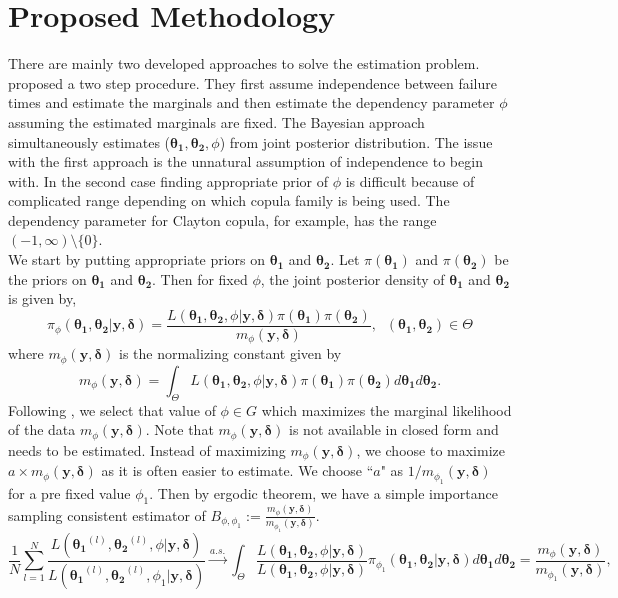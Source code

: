 \documentclass[11pt]{article}
\theoremstyle{remboldstyle}
\newcommand{\bth}{{\boldsymbol{\theta_1}}}
\newcommand{\bthe}{{\boldsymbol{\theta_2}}}
\newcommand{\y}{{\boldsymbol{y}}}
\newcommand{\de}{{\boldsymbol{\delta}}}
\begin{document}
\section{Proposed Methodology}
\label{sec:method}
\noindent
There are mainly two developed approaches to solve the estimation problem. \cite{shih:louis:1995} proposed a two step procedure.  They first assume independence between failure times and estimate the marginals and then estimate the dependency parameter $\phi$ assuming the estimated marginals are fixed. The Bayesian approach simultaneously estimates ($\mathbf{\bth}, \mathbf{\bthe}, \phi$) from joint posterior distribution. The issue with the first approach is the unnatural assumption of independence to begin with. In the second case finding appropriate prior of $\phi$  is difficult because of complicated range depending on which copula family is being used. The dependency parameter for Clayton copula, for example, has the range $ (-1, \infty)\setminus \{0\}$. \\
We start by putting appropriate priors on $\mathbf{\bth}$ and $\mathbf{\bthe}$. Let $\pi(\mathbf{\bth})$ and $\pi(\mathbf{\bthe})$ be the priors on $\mathbf{\bth}$ and $\mathbf{\bthe}$. Then for fixed $\phi$, the joint posterior density of $\mathbf{\bth}$ and $\mathbf{\bthe}$ is given by,
\begin{equation}
  \label{eq:post}
  \pi_\phi(\mathbf{\bth}, \mathbf{\bthe} | \y, \de) = \frac{L(\mathbf{\bth}, \mathbf{\bthe}, \phi| \y, \de) \pi(\mathbf{\bth})
\pi(\mathbf{\bthe})}{m_{\phi}(\y, \de)}, \;\;(\mathbf{\bth}, \mathbf{\bthe}) \in \Theta
\end{equation}
where $m_{\phi}(\y, \de)$ is the normalizing constant given by
\[
m_{\phi}(\y, \de) = \int_{\Theta} L(\mathbf{\bth}, \mathbf{\bthe}, \phi| \y, \de) \pi(\mathbf{\bth})\pi(\mathbf{\bthe}) d\mathbf{\bth} d\mathbf{\bthe}.
\]
Following \cite{roy:2014}, we select that value of $\phi \in G$ which maximizes the marginal likelihood of the data $m_{\phi}(\y, \de)$. Note that $m_{\phi}(\y, \de)$ is not available in closed form and needs to be estimated. Instead of maximizing $m_{\phi}(\y, \de)$, we choose to maximize $a \times m_{\phi}(\y, \de)$ as it is often easier to estimate. We choose ``$a$" as $1/m_{\phi_1}(\y, \de)$ for a pre fixed value $\phi_1$. Then by ergodic theorem, we have a simple importance sampling consistent estimator of $B_{\phi,\phi_1}:= \frac{m_{\phi}(\y, \de)}{m_{\phi_1}(\y, \de)}$.
\begin{equation}
  \label{eq:simbf}
\frac{1}{N} \sum_{l=1}^N \frac{L(\bth^{(l)}, \bthe^{(l)}, \phi| \y, \de)}{L(\bth^{(l)}, \bthe^{(l)}, \phi_1| \y, \de)} \stackrel{a.s.}{\rightarrow} \int_{\Theta} \frac{L(\bth, \bthe, \phi| \y, \de)}{L(\bth, \bthe, \phi| \y, \de)} \pi_{\phi_1}(\bth, \bthe| \y, \de) d\bth d\bthe =\frac{m_{\phi}(\y, \de)}{m_{\phi_1}(\y, \de)},
\end{equation}
\end{document}
